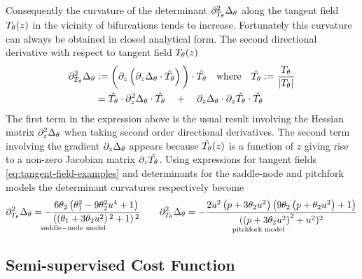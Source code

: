 Consequently the curvature of the determinant $\partial_{T_{\theta}}^2\Delta_{\theta}$ along the tangent field $T_{\theta}(z)$ in the vicinity of bifurcations tends to increase. Fortunately this curvature can always be obtained in closed analytical form. The second directional derivative with respect to tangent field $T_{\theta}(z)$
\begin{align}
    \partial_{T_{\theta}}^2\Delta_{\theta} &:=
    \bigg(
        \partial_z\left(
            \partial_z\Delta_{\theta} \cdot \hat{T_{\theta}}
        \right)
    \bigg)\cdot \hat{T_{\theta}}\quad
    \mathrm{where} \quad \hat{T_{\theta}}:=\frac{T_{\theta}}{|T_{\theta}|}\\
    &=
    \hat{T_{\theta}}\cdot\partial_z^2\Delta_{\theta}\cdot\hat{T_{\theta}}
    \quad+\quad
    \partial_z\Delta_{\theta}\cdot\partial_z\hat{T_{\theta}}\cdot\hat{T_{\theta}}
\end{align}
The first term in the expression above is the usual result involving the Hessian matrix $\partial_z^2\Delta_{\theta}$ when taking second order directional derivatives. The second term involving the gradient $\partial_z\Delta_{\theta}$ appears because $\hat{T_{\theta}}(z)$ is a function of $z$ giving rise to a non-zero Jacobian matrix $\partial_z \hat{T_{\theta}}$. Using expressions for tangent fields \eqref{eq:tangent-field-examples} and determinants for the saddle-node and pitchfork models the determinant curvatures respectively become
\begin{align}
    \underset{\mathrm{saddle-node\,\,model}}{
    \partial_{T_{\theta}}^2\Delta_{\theta} =
    -\frac{6 \theta_2 \left(\theta _1^2-9 \theta _2^2 u^4+1\right)}
    {\left(\left(\theta _1+3 \theta _2 u^2\right){}^2+1\right){}^2}}
    \qquad
    \underset{\mathrm{pitchfork\,\,model}}{
    \partial_{T_{\theta}}^2\Delta_{\theta} =
    -\frac{2 u^2 \left(p+3 \theta _2 u^2\right) \left(9 \theta _2 \left(p+\theta _2 u^2\right)+1\right)}{
    ( \left(p+3 \theta _2 u^2\right)^2+u^2 )^2
    }}
\end{align}
\subsection{Semi-supervised Cost Function}

